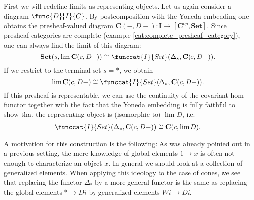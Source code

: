     First we will redefine limits as representing objects. Let us again consider a diagram $\func{D}{I}{C}$. By postcomposition with the Yoneda embedding one obtains the presheaf-valued diagram $\mathbf{C}(-, D-):\mathbf{I}\rightarrow[\mathbf{C}^{op}, \mathbf{Set}]$. Since presheaf categories are complete (example \ref{cat:complete_presheaf_category}), one can always find the limit of this diagram: \[\mathbf{Set}(s, \lim\mathbf{C}(c, D-))\cong\funccat{I}{Set}(\Delta_s, \mathbf{C}(c, D-)).\] If we restrict to the terminal set $s=\ast$, we obtain \[\lim\mathbf{C}(c, D-)\cong\funccat{I}{Set}(\Delta_\ast, \mathbf{C}(c, D-)).\] If this presheaf is representable, we can use the continuity of the covariant hom-functor together with the fact that the Yoneda embedding is fully faithful to show that the representing object is (isomorphic to) $\lim D$, i.e.
    \begin{gather}
        \funccat{I}{Set}(\Delta_\ast, \mathbf{C}(c, D-))\cong\mathbf{C}(c, \lim D).
    \end{gather}


    \begin{remark}
        A motivation for this construction is the following: As was already pointed out in a previous setting, the mere knowledge of global elements $1\rightarrow x$ is often not enough to characterize an object $x$. In general we should look at a collection of generalized elements. When applying this ideology to the case of cones, we see that replacing the functor $\Delta_\ast$ by a more general functor is the same as replacing the global elements $\ast\rightarrow Di$ by generalized elements $Wi\rightarrow Di$.
    \end{remark}

